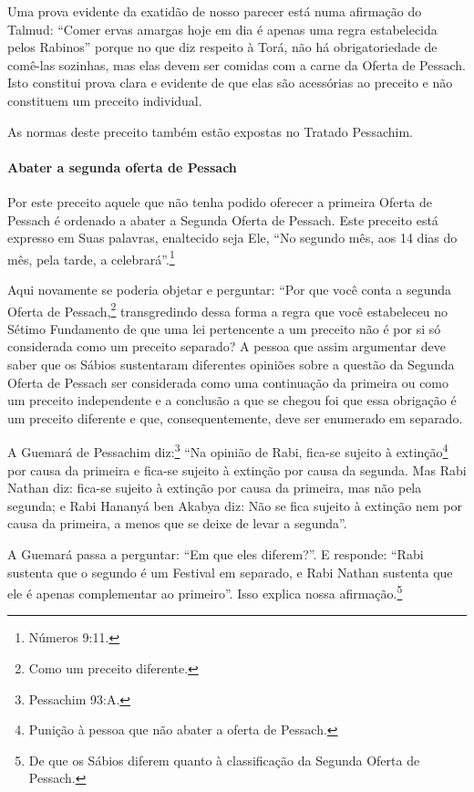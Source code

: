 Uma prova evidente da exatidão de nosso parecer está numa afirmação do
Talmud: ``Comer ervas amargas hoje em dia é apenas uma regra
estabelecida pelos Rabinos'' porque no que diz respeito à Torá, não há
obrigatoriedade de comê-las sozinhas, mas elas devem ser comidas com a
carne da Oferta de Pessach. Isto constitui prova clara e evidente de
que elas são acessórias ao preceito e não constituem um preceito
individual.

As normas deste preceito também estão expostas no Tratado Pessachim.

\paragraph{Abater a segunda oferta de Pessach}

Por este preceito aquele que não tenha podido oferecer a primeira Oferta
de Pessach é ordenado a abater a Segunda Oferta de Pessach. Este
preceito está expresso em Suas palavras, enaltecido seja Ele, ``No
segundo mês, aos 14 dias do mês, pela tarde, a celebrará''.\footnote{Números
9:11.}

Aqui novamente se poderia objetar e perguntar: ``Por que você conta a segunda Oferta de Pessach,\footnote{Como um preceito diferente.} transgredindo dessa forma a regra que você estabeleceu no Sétimo Fundamento de que uma lei pertencente a um
preceito não é por si só considerada como um preceito separado? A pessoa que
assim argumentar deve saber que os Sábios sustentaram diferentes
opiniões sobre a questão da Segunda Oferta de Pessach ser considerada
como uma continuação da primeira ou como um preceito independente e a
conclusão a que se chegou foi que essa obrigação é um preceito
diferente e que, consequentemente, deve ser enumerado em separado.

A Guemará de Pessachim diz:\footnote{Pessachim 93:A.} ``Na opinião de Rabi,
fica-se sujeito à extinção\footnote{Punição à pessoa que não abater a oferta de Pessach.} por causa da primeira e fica-se sujeito
à extinção por causa da segunda. Mas Rabi Nathan diz: fica-se sujeito à
extinção por causa da primeira,
mas não pela segunda; e Rabi Hananyá ben Akabya diz: Não se fica sujeito
à extinção nem por causa da primeira, a menos que se deixe de levar a
segunda''.

A Guemará passa a perguntar: ``Em que eles diferem?''. E responde:
``Rabi sustenta que o segundo é um Festival em separado, e Rabi Nathan
sustenta que ele é apenas complementar ao primeiro''. Isso explica nossa
afirmação.\footnote{De que os Sábios diferem quanto à classificação da Segunda Oferta de
  Pessach.}


